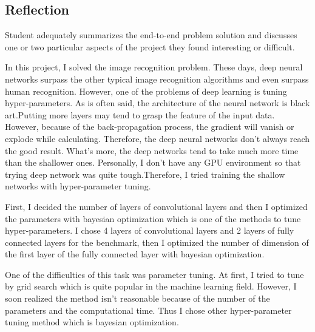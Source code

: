 \subsection{Reflection}
Student adequately summarizes the end-to-end problem solution and discusses one or two particular aspects of the project they found interesting or difficult.


In this project, I solved the image recognition problem. These days, deep neural networks surpass the other typical image recognition algorithms and even surpass human recognition. However, one of the problems of deep learning is tuning hyper-parameters.
As is often said, the architecture of the neural network is black art.Putting more layers may tend to grasp the feature of the input data. However, because of the back-propagation process, the gradient will vanish or explode while calculating. Therefore, the deep neural networks don't always reach the good result. What's more, the deep networks tend to take much more time than the shallower ones. Personally, I don't have any GPU environment so that trying deep network was quite tough.Therefore, I tried training the shallow networks with hyper-parameter tuning. 

First, I decided the number of layers of convolutional layers and then I optimized the parameters with bayesian optimization which is one of the methods to tune hyper-parameters. I chose 4 layers of convolutional layers and 2 layers of fully connected layers for the benchmark, then I optimized the number of dimension of the first layer of the fully connected layer with bayesian optimization. 

One of the difficulties of this task was parameter tuning. At first, I tried to tune by grid search which is quite popular in the machine learning field. However, I soon realized the method isn't reasonable because of the number of the parameters and the computational time. Thus I chose other hyper-parameter tuning method which is bayesian optimization.